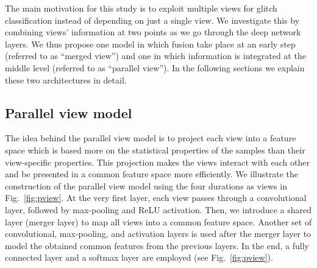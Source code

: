 \documentclass{article}
\begin{document}
The main motivation for this study is to exploit multiple views for glitch classification instead of depending on just a single view. We investigate this by combining views' information at two points as we go through the deep network layers.  We thus propose one model in which fusion take place at an early step (referred to as ``merged view'') and one in which information is integrated at the middle level (referred to as ``parallel view''). In the following sections we explain these two architectures in detail. %
\label{subsec:arc}
\subsection{Parallel view model} 
The idea behind the parallel view model is to project each view into a feature space which is based more on the statistical properties of the samples than their view-specific properties. This projection makes the views interact with each other and be presented in a common feature space more efficiently. We illustrate the construction of the parallel view model using the four durations as views in Fig.~\ref{fig:pview}.
At the very first layer, each view passes through a convolutional layer, followed by max-pooling and ReLU activation. Then, we introduce a shared layer (merger layer) to map all views into a common feature space. Another set of convolutional, max-pooling, and activation layers is used after the merger layer to model the obtained common features from the previous layers. In the end, a fully connected layer and a softmax layer are employed (see Fig.~\ref{fig:pview}).
\end{document}
